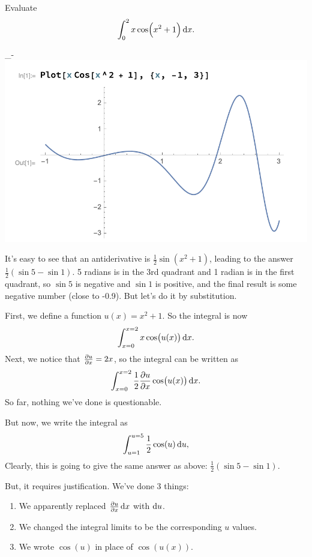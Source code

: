 \begin{example}
  Evaluate
  \begin{align*}
    \int_{0}^{2} x\cos(x^2 + 1) \dx.
  \end{align*}
  \begin{mdframed}
    _-\includegraphics[width=400pt]{img/calculus-integration-by-substitution-example-1.png}
  \end{mdframed}

  It's easy to see that an antiderivative is $\frac{1}{2}\sin(x^2 + 1)$, leading to the answer
  $\frac{1}{2}(\sin 5 - \sin 1)$. 5 radians is in the 3rd quadrant and 1 radian is in the first
  quadrant, so $\sin 5$ is negative and $\sin 1$ is positive, and the final result is some negative
  number (close to -0.9). But let's do it by substitution.

  First, we define a function $u(x) = x^2 + 1$. So the integral is now
  \begin{align*}
    \int_{x=0}^{x=2} x\cos(u(x)) \dx.
  \end{align*}
  Next, we notice that $\frac{\partial u}{\partial x} = 2x$, so the integral can be written as
  \begin{align*}
    \int_{x=0}^{x=2} \frac{1}{2} \dudx \cos(u(x)) \dx.
  \end{align*}
  So far, nothing we've done is questionable.

  But now, we write the integral as
  \begin{align*}
    \int_{u=1}^{u=5} \frac{1}{2} \cos(u) \du,
  \end{align*}
  Clearly, this is going to give the same answer as above: $\frac{1}{2}(\sin 5 - \sin 1)$.

  But, it requires justification. We've done 3 things:
  \begin{enumerate}
  \item We apparently replaced $\dudx \dx$ with $\du$.
  \item We changed the integral limits to be the corresponding $u$ values.
  \item We wrote $\cos(u)$ in place of $\cos(u(x))$.
  \end{enumerate}

\end{example}



